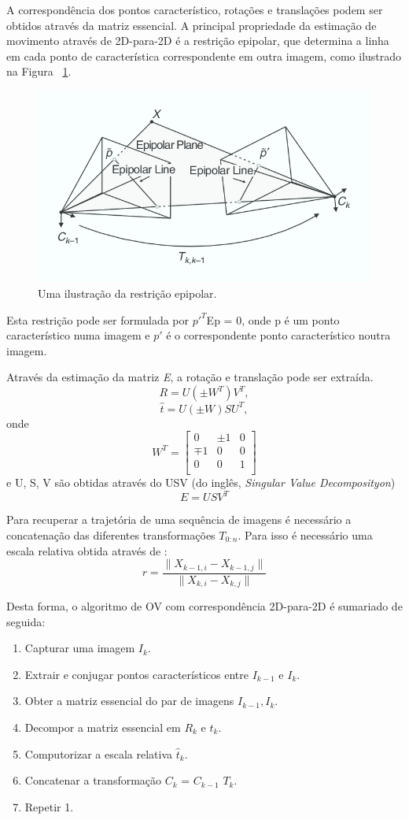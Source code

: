 A correspondência dos pontos característico, rotações e translações podem ser obtidos através da matriz essencial. A principal propriedade da estimação de movimento através de 2D-para-2D é a restrição epipolar, que determina a linha em cada ponto de característica correspondente em outra imagem, como ilustrado na Figura ~\ref{fig:epipolarconstrait}.

\begin{figure}[h!]
	\centering
	\includegraphics[width=0.7\linewidth]{figures/equipolarline}
	\caption{Uma ilustração da restrição epipolar. \cite{VOpart1}}
	\label{fig:epipolarconstrait}
\end{figure}

Esta restrição pode ser formulada por $p'^{T}$Ep = 0, onde p é um ponto característico numa imagem e $p'$ é o correspondente ponto característico noutra imagem.

Através da estimação da matriz \textit{E}, a rotação e translação pode ser extraída. 
\[ R = U(\pm W^T)V^T ,\] \[ \hat{t} =  U(\pm W)SU^T, \] 
onde \[  W^T = \left[\begin{array}{ccc}0&\pm1&0\\\mp1&0&0\\0&0&1\\\end{array}\right] \] 
e U, S, V são obtidas através do USV (do inglês, \textit{Singular Value Decomposityon}) \[ E = USV^T \]

Para recuperar a trajetória de uma sequência de imagens é necessário a concatenação das diferentes transformações \textit{$T_{0:n}$}. Para isso é necessário uma escala relativa obtida através de : \[ r = \frac{ \| X_{k-1,i} - X_{k-1,j} \| }{ \| X_{k,i} - X_{k,j} \| } \] 

Desta forma, o algoritmo de OV com correspondência 2D-para-2D é sumariado de seguida:
\begin{enumerate}
	\item Capturar uma imagem \textit{$I_{k}$}.
	\item Extrair e conjugar pontos característicos entre \textit{$I_{k-1}$} e \textit{$I_{k}$}.
	\item Obter a matriz essencial do par de imagens \textit{$I_{k-1},I_k$}.
	\item Decompor a matriz essencial em \textit{$R_k$} e \textit{$\hat{t}_k$}.
	\item Computorizar a escala relativa \textit{$\hat{t}_k$}.
	\item Concatenar a transformação $C_k$ = $C_{k-1}$ $T_k$.
	\item Repetir 1.
\end{enumerate}


